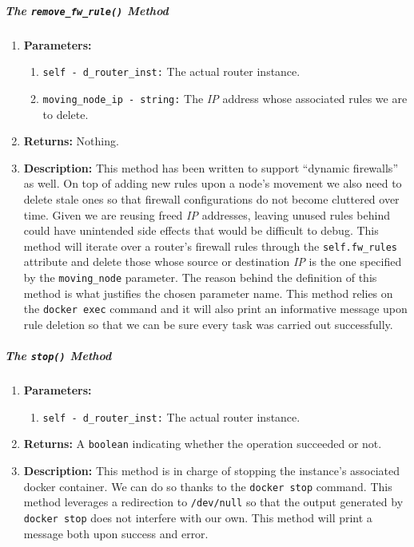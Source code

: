         \subparagraph{The \texttt{remove\_fw\_rule()} Method}
            \begin{enumerate}
                \item \textbf{Parameters:}
                \begin{enumerate}
                    \item \texttt{self - d\_router\_inst:} The actual router instance.
                    \item \texttt{moving\_node\_ip - string:} The \textit{IP} address whose associated rules we are to delete.
                \end{enumerate}
                \item \textbf{Returns:} Nothing.
                \item \textbf{Description:} This method has been written to support ``dynamic firewalls'' as well. On top of adding new rules upon a node's movement we also need to delete stale ones so that firewall configurations do not become cluttered over time. Given we are reusing freed \textit{IP} addresses, leaving unused rules behind could have unintended side effects that would be difficult to debug. This method will iterate over a router's firewall rules through the \texttt{self.fw\_rules} attribute and delete those whose source or destination \textit{IP} is the one specified by the \texttt{moving\_node} parameter. The reason behind the definition of this method is what justifies the chosen parameter name. This method relies on the \texttt{docker exec} command and it will also print an informative message upon rule deletion so that we can be sure every task was carried out successfully.
            \end{enumerate}

        \subparagraph{The \texttt{stop()} Method}
            \begin{enumerate}
                \item \textbf{Parameters:}
                \begin{enumerate}
                    \item \texttt{self - d\_router\_inst:} The actual router instance.
                \end{enumerate}
                \item \textbf{Returns:} A \texttt{boolean} indicating whether the operation succeeded or not.
                \item \textbf{Description:} This method is in charge of stopping the instance's associated docker container. We can do so thanks to the \texttt{docker stop} command. This method leverages a redirection to \texttt{/dev/null} so that the output generated by \texttt{docker stop} does not interfere with our own. This method will print a message both upon success and error.
            \end{enumerate}

